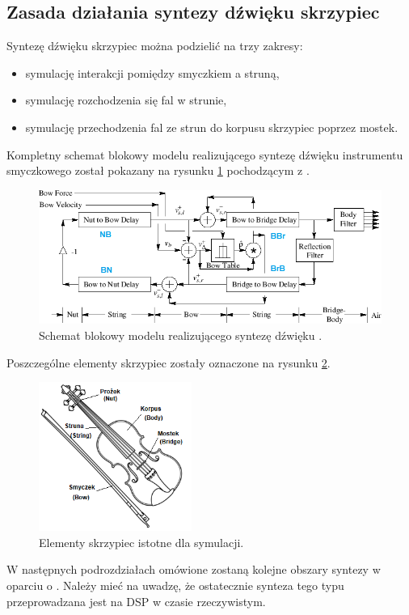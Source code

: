 \subsection{Zasada działania syntezy dźwięku skrzypiec}
Syntezę dźwięku skrzypiec można podzielić na trzy zakresy:
\begin{itemize}
	\setlength\itemsep{-3pt}
	\item symulację interakcji pomiędzy smyczkiem a struną,
	\item symulację rozchodzenia się fal w strunie,
	\item symulację przechodzenia fal ze strun do korpusu skrzypiec poprzez mostek.
\end{itemize}
Kompletny schemat blokowy modelu realizującego syntezę dźwięku instrumentu smyczkowego został pokazany na rysunku \ref{rys:schematblokowy} pochodzącym z \cite{bowed_3}.
\begin{figure}[H]
	\centering
	\includegraphics[width=12cm]{grafiki/schematblokowy}
	\captionsetup{justification=centering}
	\caption{Schemat blokowy modelu realizującego syntezę dźwięku \cite{bowed_3}.}
	\label{rys:schematblokowy}
\end{figure}
Poszczególne elementy skrzypiec zostały oznaczone na rysunku \ref{rys:skrzypce}.
\begin{figure}[H]
	\centering
	\includegraphics[width=5cm]{grafiki/skrzypce}
	\captionsetup{justification=centering}
	\caption{Elementy skrzypiec istotne dla symulacji.}
	\label{rys:skrzypce}
\end{figure}

W następnych podrozdziałach omówione zostaną kolejne obszary syntezy w oparciu o \cite{bowed_smith}. Należy mieć na uwadzę, że ostatecznie synteza tego typu przeprowadzana jest na DSP w czasie rzeczywistym.


